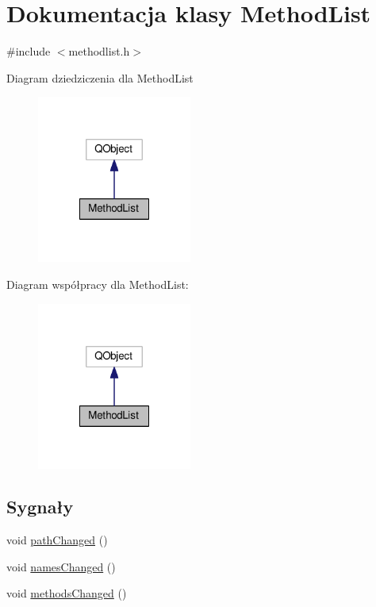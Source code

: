 \hypertarget{class_method_list}{\section{Dokumentacja klasy Method\-List}
\label{class_method_list}
}


{\ttfamily \#include $<$methodlist.\-h$>$}



Diagram dziedziczenia dla Method\-List
\nopagebreak
\begin{figure}[H]
\begin{center}
\leavevmode
\includegraphics[width=144pt]{class_method_list__inherit__graph}
\end{center}
\end{figure}


Diagram współpracy dla Method\-List\-:
\nopagebreak
\begin{figure}[H]
\begin{center}
\leavevmode
\includegraphics[width=144pt]{class_method_list__coll__graph}
\end{center}
\end{figure}
\subsection*{Sygnały}
\begin{DoxyCompactItemize}
\item 
void \hyperlink{class_method_list_a964af96ad04ea475a562ef9c437c9395}{path\-Changed} ()
\item 
void \hyperlink{class_method_list_a22b1996a1f49c974ffcc596e3840747a}{names\-Changed} ()
\item 
void \hyperlink{class_method_list_aaf15b5a1bfb251c39fc5d50c2f7e39d7}{methods\-Changed} ()
\end{DoxyCompactItemize}
